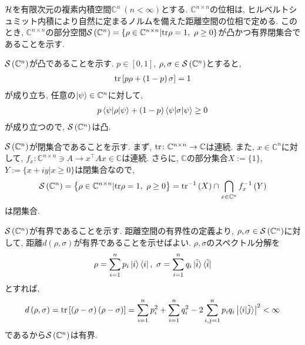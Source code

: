 \begin{ex}
    \label{ex9.9}
    $\mathcal{H}$を有限次元の複素内積空間$\mathbb{C}^n \ \left(n < \infty\right)$とする. $\mathbb{C}^{n \times n}$の位相は, ヒルベルトシュミット内積により自然に定まるノルムを備えた距離空間の位相で定める. このとき, $\mathbb{C}^{n \times n}$の部分空間$\mathcal{S}\left({\mathbb{C}^{n}}\right) = \left\{ \rho \in \mathbb{C}^{n \times n} | \mathrm{tr}\rho = 1,\  \rho \ge 0\right\}$が凸かつ有界閉集合であることを示す.

    $\mathcal{S}\left({\mathbb{C}^{n}}\right)$が凸であることを示す. $p \in \left[0,1\right]$, $\rho, \sigma \in \mathcal{S}\left({\mathbb{C}^{n}}\right)$とすると, 
    \begin{align*}
        \mathrm{tr}\left[ p \rho + \left(1-p\right)\sigma\right] = 1
    \end{align*}
    が成り立ち, 任意の$\ket{\psi} \in \mathbb{C}^n$に対して, 
    \begin{align*}
        p \braket{\psi|\rho|\psi} + (1-p) \braket{\psi|\sigma|\psi} \ge 0
    \end{align*}
    が成り立つので, $\mathcal{S}\left({\mathbb{C}^{n}}\right)$は凸.

    $\mathcal{S}\left({\mathbb{C}^{n}}\right)$が閉集合であることを示す. まず, $\mathrm{tr} \colon \mathbb{C}^{n \times n} \to \mathbb{C}$は連続. また, $x \in \mathbb{C}^{n}$に対して, $f_x \colon \mathbb{C}^{n \times n} \ni A \to x^\top A x \in \mathbb{C}$は連続. さらに, $\mathbb{C}$の部分集合$X := \{1\}$, $ Y := \{x + iy | x \ge 0\}$は閉集合なので, 
    \begin{align}
        \mathcal{S}\left({\mathbb{C}^{n}}\right)
        =
        \left\{ \rho \in \mathbb{C}^{n \times n} | \mathrm{tr}\rho = 1, \ \rho \ge 0\right\}
        =
        \mathrm{tr}^{-1}\left(X\right)
        \cap
        \bigcap_{x \in \mathbb{C}^n} f_x^{-1}\left(Y\right)
    \end{align}
    は閉集合. 

    $\mathcal{S}\left({\mathbb{C}^{n}}\right)$が有界であることを示す. 距離空間の有界性の定義より, $\rho, \sigma \in \mathcal{S}\left({\mathbb{C}^n}\right)$に対して, 距離$d\left(\rho, \sigma\right)$が有界であることを示せばよい. $\rho, \sigma$のスペクトル分解を
    \begin{align}
        \rho = \sum_{i=1}^n p_i \ket{i}\bra{i}, \ \sigma = \sum_{i=1}^n q_i \ket{\tilde{i}}\bra{\tilde{i}}
    \end{align}
    とすれば, 
    \begin{align}
        d \left(\rho, \sigma\right) 
        =
        \mathrm{tr}\left[ \left(\rho-\sigma\right)\left(\rho-\sigma\right)\right] 
        =
        \sum_{i=1}^n p_i^2 + \sum_{i=1}^n q_i^2 - 2 \sum_{i,j = 1}^n p_i q_i \left| \braket{i|\tilde{j}}\right|^2 < \infty
    \end{align}
    であるから$\mathcal{S}\left({\mathbb{C}^{n}}\right)$は有界.


\end{ex}
